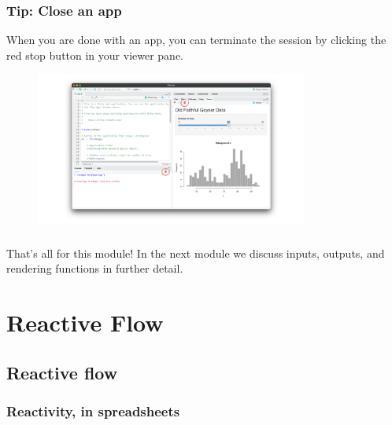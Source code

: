 \documentclass[
  letterpaper,
  DIV=11,
  numbers=noendperiod]{scrreprt}
\begin{document}
\hypertarget{tip-close-an-app}{%
\subsection{Tip: Close an app}\label{tip-close-an-app}}

When you are done with an app, you can terminate the session by clicking
the red stop button in your viewer pane.

\begin{figure}

{\centering \includegraphics[width=0.8\textwidth,height=\textheight]{./images/recap-6.png}

}

\end{figure}

\hypertarget{section-10}{%
\subsection{}\label{section-10}}

That's all for this module! In the next module we discuss inputs,
outputs, and rendering functions in further detail.

\hypertarget{reactive-flow}{%
\chapter{Reactive Flow}\label{reactive-flow}}

\hypertarget{reactive-flow-1}{%
\section{Reactive flow}\label{reactive-flow-1}}

\hypertarget{reactivity-in-spreadsheets}{%
\subsection{Reactivity, in
spreadsheets}\label{reactivity-in-spreadsheets}}
\end{document}
